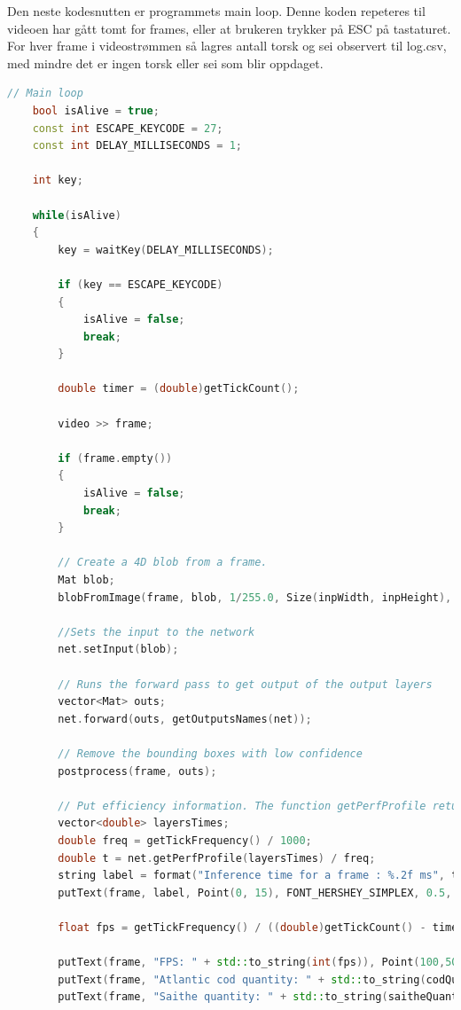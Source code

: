 Den neste kodesnutten er programmets main loop. Denne koden repeteres til videoen har gått tomt for frames, eller at brukeren trykker på ESC på tastaturet. For hver frame i videostrømmen så lagres antall torsk og sei observert til log.csv, med mindre det er ingen torsk eller sei som blir oppdaget.

\begin{lstlisting}[language=C++, caption=main.cpp]
    // Main loop
    bool isAlive = true;
    const int ESCAPE_KEYCODE = 27;
    const int DELAY_MILLISECONDS = 1;

    int key;

    while(isAlive)
    {
        key = waitKey(DELAY_MILLISECONDS);

        if (key == ESCAPE_KEYCODE)
        {
            isAlive = false;
            break;
        }

        double timer = (double)getTickCount();

        video >> frame;

        if (frame.empty())
        {
            isAlive = false;
            break;
        }

        // Create a 4D blob from a frame.
        Mat blob;
        blobFromImage(frame, blob, 1/255.0, Size(inpWidth, inpHeight), Scalar(0,0,0), true, false);

        //Sets the input to the network
        net.setInput(blob);

        // Runs the forward pass to get output of the output layers
        vector<Mat> outs;
        net.forward(outs, getOutputsNames(net));

        // Remove the bounding boxes with low confidence
        postprocess(frame, outs);

        // Put efficiency information. The function getPerfProfile returns the overall time for inference(t) and the timings for each of the layers(in layersTimes)
        vector<double> layersTimes;
        double freq = getTickFrequency() / 1000;
        double t = net.getPerfProfile(layersTimes) / freq;
        string label = format("Inference time for a frame : %.2f ms", t);
        putText(frame, label, Point(0, 15), FONT_HERSHEY_SIMPLEX, 0.5, Scalar(0, 0, 255));

        float fps = getTickFrequency() / ((double)getTickCount() - timer);

        putText(frame, "FPS: " + std::to_string(int(fps)), Point(100,50), FONT_HERSHEY_SIMPLEX, 0.75, Scalar(50,170,50), 2);
        putText(frame, "Atlantic cod quantity: " + std::to_string(codQuantity), Point(100,100), FONT_HERSHEY_SIMPLEX, 0.75, Scalar(50,170,50), 2);
        putText(frame, "Saithe quantity: " + std::to_string(saitheQuantity), Point(100,130), FONT_HERSHEY_SIMPLEX, 0.75, Scalar(50,170,50), 2);


\end{lstlisting}
